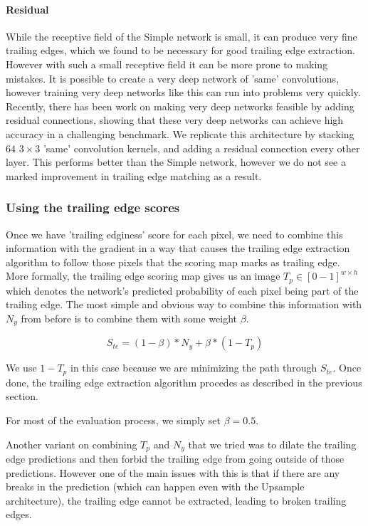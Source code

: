 
\paragraph{Residual}
While the receptive field of the Simple network is small, it can produce very fine trailing edges, which we found to be necessary for good trailing edge extraction.
However with such a small receptive field it can be more prone to making mistakes.
It is possible to create a very deep network of 'same' convolutions, however training very deep networks like this can run into problems very quickly.
Recently, there has been work on making very deep networks feasible by adding residual connections\cite{he2015deep}, showing that these very deep networks can achieve high accuracy in a challenging benchmark.
We replicate this architecture by stacking $64$ $3\times3$ 'same' convolution kernels, and adding a residual connection every other layer.
This performs better than the Simple network, however we do not see a marked improvement in trailing edge matching as a result.

\subsubsection{Using the trailing edge scores}

Once we have 'trailing edginess' score for each pixel, we need to combine this information with the gradient in a way that causes the trailing edge extraction algorithm to follow those pixels that the scoring map marks as trailing edge.
More formally, the trailing edge scoring map gives us an image $T_p \in [0-1]^{w \times h}$ which denotes the network's predicted probability of each pixel being part of the trailing edge.
The most simple and obvious way to combine this information with $N_y$ from before is to combine them with some weight $\beta$.

\begin{equation}
S_{te} = (1 - \beta)*N_y + \beta*(1 - T_p)
\end{equation}

We use $1 - T_p$ in this case because we are minimizing the path through $S_{te}$.
Once done, the trailing edge extraction algorithm procedes as described in the previous section.

For most of the evaluation process, we simply set $\beta = 0.5$.

Another variant on combining $T_p$ and $N_y$ that we tried was to dilate the trailing edge predictions and then forbid the trailing edge from going outside of those predictions.
However one of the main issues with this is that if there are any breaks in the prediction (which can happen even with the Upsample architecture), the trailing edge cannot be extracted, leading to broken trailing edges.

